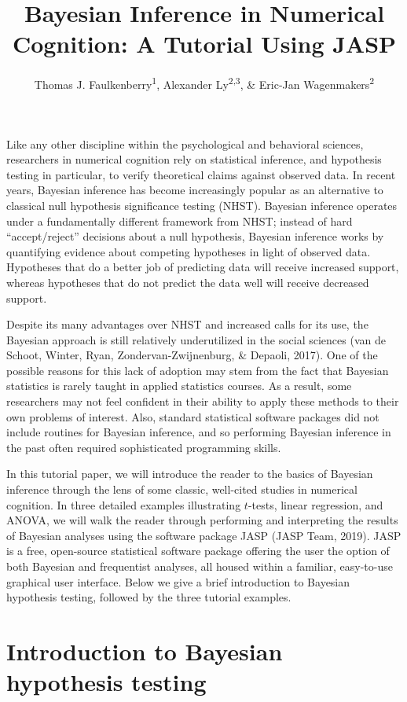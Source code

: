 \documentclass[english,,doc,floatsintext]{apa6}
\author{Thomas J. Faulkenberry\textsuperscript{1}, Alexander Ly\textsuperscript{2,3}, \& Eric-Jan Wagenmakers\textsuperscript{2}}
\affiliation{
\vspace{0.5cm}
\textsuperscript{1} Tarleton State University\\\textsuperscript{2} University of Amsterdam\\\textsuperscript{3} Centrum Wiskunde \& Informatica}
\title{Bayesian Inference in Numerical Cognition: A Tutorial Using JASP}
\date{}
\begin{document}
\maketitle

Like any other discipline within the psychological and behavioral sciences, researchers in numerical cognition rely on statistical inference, and hypothesis testing in particular, to verify theoretical claims against observed data. In recent years, Bayesian inference has become increasingly popular as an alternative to classical null hypothesis significance testing (NHST). Bayesian inference operates under a fundamentally different framework from NHST; instead of hard \enquote{accept/reject} decisions about a null hypothesis, Bayesian inference works by quantifying evidence about competing hypotheses in light of observed data. Hypotheses that do a better job of predicting data will receive increased support, whereas hypotheses that do not predict the data well will receive decreased support.

Despite its many advantages over NHST and increased calls for its use, the Bayesian approach is still relatively underutilized in the social sciences (van de Schoot, Winter, Ryan, Zondervan-Zwijnenburg, \& Depaoli, 2017). One of the possible reasons for this lack of adoption may stem from the fact that Bayesian statistics is rarely taught in applied statistics courses. As a result, some researchers may not feel confident in their ability to apply these methods to their own problems of interest. Also, standard statistical software packages did not include routines for Bayesian inference, and so performing Bayesian inference in the past often required sophisticated programming skills.

In this tutorial paper, we will introduce the reader to the basics of Bayesian inference through the lens of some classic, well-cited studies in numerical cognition. In three detailed examples illustrating \(t\)-tests, linear regression, and ANOVA, we will walk the reader through performing and interpreting the results of Bayesian analyses using the software package JASP (JASP Team, 2019). JASP is a free, open-source statistical software package offering the user the option of both Bayesian and frequentist analyses, all housed within a familiar, easy-to-use graphical user interface. Below we give a brief introduction to Bayesian hypothesis testing, followed by the three tutorial examples.

\hypertarget{introduction-to-bayesian-hypothesis-testing}{%
\section{Introduction to Bayesian hypothesis testing}\label{introduction-to-bayesian-hypothesis-testing}}
\end{document}
